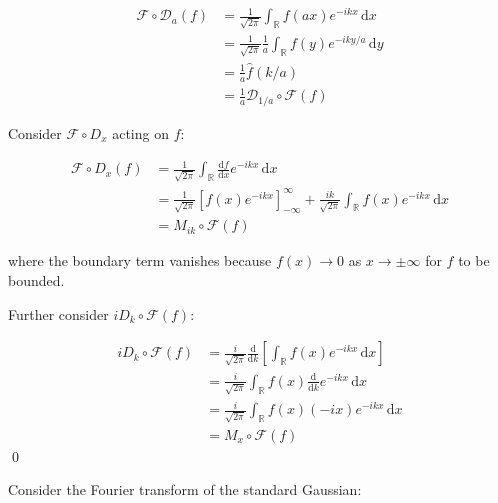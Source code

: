 \documentclass[12pt]{article}
\begin{document}
\begin{equation}
\begin{split}
    \mathcal{F} \circ \mathcal{D}_{a}(f) &= \frac{1}{\sqrt{2\pi}} \int_{\mathbb{R}} f(ax) e^{-ikx} \, \mathrm{d}x \\
    &= \frac{1}{\sqrt{2\pi}} \frac{1}{a} \int_{\mathbb{R}} f(y) e^{-iky/a} \, \mathrm{d}y \\
    &= \frac{1}{a} \hat{f}(k/a) \\
    &= \frac{1}{a} \mathcal{D}_{1/a} \circ \mathcal{F}(f)
\end{split}
\end{equation}

Consider $\mathcal{F} \circ D_{x}$ acting on $f$:

\begin{equation}
\begin{split}
    \mathcal{F} \circ D_{x}(f) &= \frac{1}{\sqrt{2\pi}} \int_{\mathbb{R}} \frac{\mathrm{d}f}{\mathrm{d}x} e^{-ikx} \, \mathrm{d}x \\
    &= \frac{1}{\sqrt{2\pi}} \left[ f(x) e^{-ikx} \right]_{-\infty}^{\infty} + \frac{ik}{\sqrt{2\pi}} \int_{\mathbb{R}} f(x) e^{-ikx} \, \mathrm{d}x \\
    &= M_{ik} \circ \mathcal{F}(f)
\end{split}
\end{equation}

where the boundary term vanishes because $f(x) \to 0$ as $x \to \pm \infty$ for $f$ to be bounded.

Further consider $iD_{k} \circ \mathcal{F}(f)$:

\begin{equation}
\begin{split}
    iD_{k} \circ \mathcal{F}(f) &= \frac{i}{\sqrt{2\pi}} \frac{\mathrm{d}}{\mathrm{d}k} \left[ \int_{\mathbb{R}} f(x) e^{-ikx} \, \mathrm{d}x \right] \\
    &= \frac{i}{\sqrt{2\pi}} \int_{\mathbb{R}} f(x) \frac{\mathrm{d}}{\mathrm{d}k} e^{-ikx} \, \mathrm{d}x \\
    &= \frac{i}{\sqrt{2\pi}} \int_{\mathbb{R}} f(x) (-ix) e^{-ikx} \, \mathrm{d}x \\
    &= M_{x} \circ \mathcal{F}(f)
\end{split}
\end{equation}
\qed



Consider the Fourier transform of the standard Gaussian:
\end{document}
